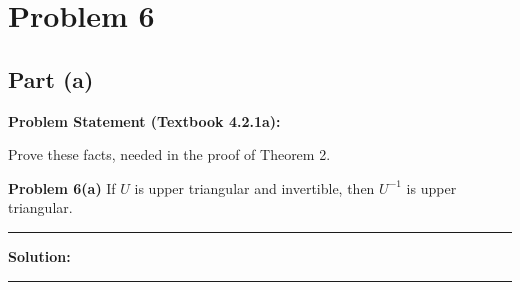 \clearpage
\section*{Problem 6}

\subsection*{Part (a)}

\textbf{Problem Statement (Textbook 4.2.1a):} 

Prove these facts, needed in the proof of Theorem 2.

\textbf{\textbf{Problem 6(a)}} If $U$ is upper triangular and invertible, then $U^{-1}$ is upper triangular.

\noindent\rule{\textwidth}{0.4pt}

\vspace{1em}

\textbf{Solution:}


\vspace{2em}
\noindent\rule{\textwidth}{0.4pt}
